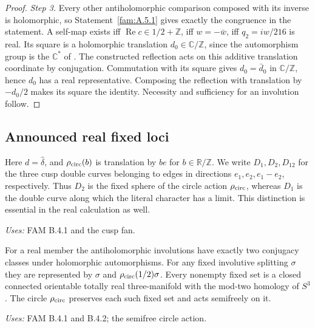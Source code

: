 \begin{proof}
\par\noindent\textit{Step 3.} Every other antiholomorphic comparison composed with its inverse is
holomorphic, so Statement~\ref{fam:A.5.1} gives exactly the congruence in the statement.
A self-map exists iff $\operatorname{Re}c\in1/2+\mathbb Z$, iff
$w=-\bar w$, iff $q_2=iw/216$ is real. Its square is a holomorphic
translation $d_0\in\mathbb C/\mathbb Z$, since the automorphism group
is the $\mathbb C^*$ of \cite[theorem \texttt{p2:thm:full-automorphisms}]{DGKXv1}. The constructed reflection acts on
this additive translation coordinate by conjugation. Commutation
with its square gives $d_0=\bar d_0$ in $\mathbb C/\mathbb Z$, hence
$d_0$ has a real representative. Composing the reflection with
translation by $-d_0/2$ makes its square the identity. Necessity and
sufficiency for an involution follow.
\end{proof}

\subsection{Announced real fixed loci}
\begin{definition}\label{maps:A.3.setup}
Here $d=\widehat\delta$, and $\rho_{\rm circ}(b)$ is translation by $be$ for $b\in\mathbb R/\mathbb Z$.
We write $D_1,D_2,D_{12}$ for the three cusp double curves belonging to
edges in directions $e_1,e_2,e_1-e_2$, respectively. Thus $D_2$ is the
fixed sphere of the circle action $\rho_{\rm circ}$, whereas $D_1$ is the double
curve along which the literal character has a limit. This distinction
is essential in the real calculation as well.
\end{definition}
\noindent\emph{Uses:} FAM B.4.1 and the cusp fan.\par

\begin{announcement}[MAPS A.3.1; A]\label{maps:A.3.1}
For a real member the antiholomorphic involutions have exactly two
conjugacy classes under holomorphic automorphisms. For any fixed
involutive splitting $\sigma$ they are represented by $\sigma$ and
$\rho_{\rm circ}(1/2)\sigma$. Every nonempty fixed set is a closed connected
orientable totally real three-manifold with the mod-two homology of
$S^3$. The circle $\rho_{\rm circ}$ preserves each such fixed set and acts
semifreely on it.
\end{announcement}
\noindent\emph{Uses:} FAM B.4.1 and B.4.2; the semifree circle action.\par

